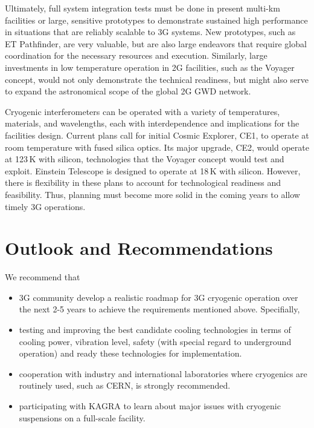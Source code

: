 Ultimately, full system integration tests must be done in present multi-km facilities or large, sensitive prototypes to demonstrate sustained high performance in situations that are reliably scalable to 3G systems. New prototypes, such as ET Pathfinder, are very valuable, but are also large endeavors that require global coordination for the necessary resources and execution. Similarly, large investments in low temperature operation in 2G facilities, such as the Voyager concept, would not only demonstrate the technical readiness, but might also serve to expand the astronomical scope of the global 2G GWD network. 



Cryogenic interferometers can be operated with a variety of temperatures, materials, and wavelengths, each with interdependence and implications for the facilities design. Current plans call for initial Cosmic Explorer, CE1, to operate at room temperature with fused silica optics. Its major upgrade, CE2, would operate at 123\,K with silicon, technologies that the Voyager concept would test and exploit. Einstein Telescope is designed to operate at 18\,K with silicon. However, there is flexibility in these plans to account for technological readiness and feasibility. Thus, planning must become more solid in the coming years to allow timely 3G operations. 

\section{Outlook and Recommendations}
We recommend that 
\begin{itemize}
\item 3G community develop a realistic roadmap for 3G cryogenic operation over the next 2-5 years to achieve the requirements mentioned above.  Specifially,
\item testing and improving the best candidate cooling technologies in terms of cooling power, vibration level, safety (with special regard to underground operation) and ready these technologies for implementation. 
\item  cooperation with industry and international laboratories where cryogenics are routinely used, such as CERN, is strongly recommended. 
\item participating with KAGRA to learn about major issues with cryogenic suspensions  on a full-scale facility.
\end{itemize}


